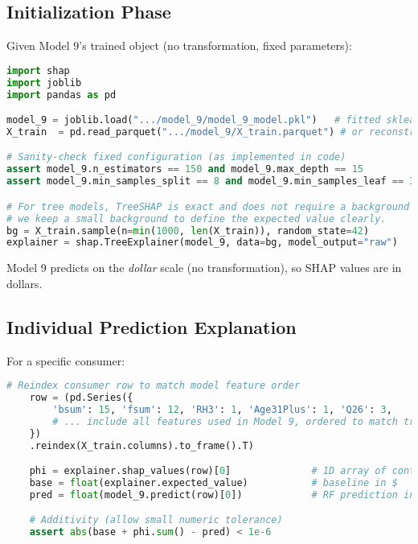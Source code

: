 \subsection{Initialization Phase}
Given Model 9's trained object (no transformation, fixed parameters):
\begin{lstlisting}[language=Python, caption=TreeSHAP initialization for Model 9 (dollar scale)]
import shap
import joblib
import pandas as pd

model_9 = joblib.load(".../model_9/model_9_model.pkl")   # fitted sklearn RF
X_train  = pd.read_parquet(".../model_9/X_train.parquet") # or reconstruct from pipeline

# Sanity-check fixed configuration (as implemented in code)
assert model_9.n_estimators == 150 and model_9.max_depth == 15
assert model_9.min_samples_split == 8 and model_9.min_samples_leaf == 3

# For tree models, TreeSHAP is exact and does not require a background dataset;
# we keep a small background to define the expected value clearly.
bg = X_train.sample(n=min(1000, len(X_train)), random_state=42)
explainer = shap.TreeExplainer(model_9, data=bg, model_output="raw")
\end{lstlisting}
%
Model 9 predicts on the \emph{dollar} scale (no transformation), so SHAP values are in dollars. 

\subsection{Individual Prediction Explanation}
For a specific consumer:
%
\begin{lstlisting}[language=Python, caption=Computing SHAP values for one consumer (dollar scale)]
    # Reindex consumer row to match model feature order
    row = (pd.Series({
        'bsum': 15, 'fsum': 12, 'RH3': 1, 'Age31Plus': 1, 'Q26': 3,
        # ... include all features used in Model 9, ordered to match training columns
    })
    .reindex(X_train.columns).to_frame().T)

    phi = explainer.shap_values(row)[0]              # 1D array of contributions in $
    base = float(explainer.expected_value)           # baseline in $
    pred = float(model_9.predict(row)[0])            # RF prediction in $

    # Additivity (allow small numeric tolerance)
    assert abs(base + phi.sum() - pred) < 1e-6
\end{lstlisting}

